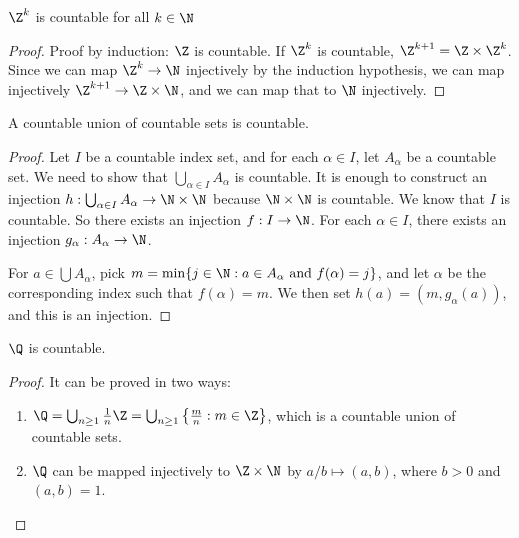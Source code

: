 \documentclass[a4paper]{article}
\begin{document}
\begin{prop}
  $\Z^k$ is countable for all $k\in \N$
\end{prop}

\begin{proof}
  Proof by induction: $\Z$ is countable. If $\Z^k$ is countable, $\Z^{k + 1} = \Z\times \Z^k$. Since we can map $\Z^k \to \N$ injectively by the induction hypothesis, we can map injectively $\Z^{k + 1}\to \Z\times \N$, and we can map that to $\N$ injectively.
\end{proof}

\begin{thm}
  A countable union of countable sets is countable.
\end{thm}

\begin{proof}
  Let $I$ be a countable index set, and for each $\alpha \in I$, let $A_\alpha$ be a countable set. We need to show that $\bigcup_{\alpha\in I} A_\alpha$ is countable. It is enough to construct an injection $h: \bigcup_{\alpha\in I} A_\alpha \to \N\times \N$ because $\N\times\N$ is countable. We know that $I$ is countable. So there exists an injection $f: I\to \N$. For each $\alpha\in I$, there exists an injection $g_\alpha: A_\alpha \to\N$.

  For $a\in \bigcup A_\alpha$, pick $m = \min\{j\in \N: a\in A_{\alpha}\text{ and }f(\alpha) = j\}$, and let $\alpha$ be the corresponding index such that $f(\alpha) = m$. We then set $h(a) = (m, g_\alpha(a))$, and this is an injection.
\end{proof}

\begin{prop}
  $\Q$ is countable.
\end{prop}
\begin{proof}
  It can be proved in two ways:
  \begin{enumerate}
    \item $\Q = \bigcup_{n\geq 1} \frac{1}{n}\Z = \bigcup_{n\geq 1} \left\{\frac{m}{n}: m\in \Z\right\}$, which is a countable union of countable sets.
    \item $\Q$ can be mapped injectively to $\Z\times \N$ by $a/b\mapsto (a, b)$, where $b > 0$ and $(a, b) = 1$.
  \end{enumerate}
\end{proof}
\end{document}
